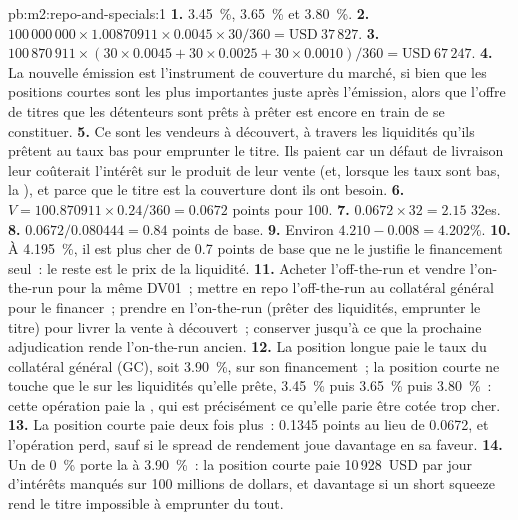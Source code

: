 \begin{solution}{pb:m2:repo-and-specials:1}
\textbf{1.} 3.45~\%, 3.65~\% et 3.80~\%.
\textbf{2.} $100\,000\,000 \times 1.00870911 \times 0.0045 \times 30/360 =
\text{USD}~37\,827$.
\textbf{3.} $100\,870\,911 \times (30 \times 0.0045 + 30 \times 0.0025 + 30 \times
0.0010)/360 = \text{USD}~67\,247$.
\textbf{4.} La nouvelle émission est l'instrument de couverture du marché, si bien que les positions courtes sont
les plus importantes juste après l'émission, alors que l'offre de titres que les détenteurs sont prêts à prêter
est encore en train de se constituer.
\textbf{5.} Ce sont les vendeurs à découvert, à travers les liquidités qu'ils prêtent au taux bas pour emprunter le
titre. Ils paient car un défaut de livraison leur coûterait l'intérêt sur le produit de leur vente
(et, lorsque les taux sont bas, la ), et parce que le titre est
la couverture dont ils ont besoin.
\textbf{6.} $V = 100.870911 \times 0.24/360 = 0.0672$ points pour 100.
\textbf{7.} $0.0672 \times 32 = 2.15$ 32es.
\textbf{8.} $0.0672/0.080444 = 0.84$ points de base.
\textbf{9.} Environ $4.210 - 0.008 = 4.202\%$.
\textbf{10.} À 4.195~\%, il est plus cher de 0.7 points de base que ne le justifie le
financement seul~: le reste est le prix de la liquidité.
\textbf{11.} Acheter l'off-the-run et vendre l'on-the-run pour la même DV01~; mettre en repo
l'off-the-run au collatéral général pour le financer~; prendre en 
l'on-the-run (prêter des liquidités, emprunter le titre) pour livrer la vente à découvert~; conserver jusqu'à ce que la
prochaine adjudication rende l'on-the-run ancien.
\textbf{12.} La position longue paie le taux du collatéral général (GC), soit 3.90~\%, sur son financement~; la position courte ne touche que
le  sur les liquidités qu'elle prête, 3.45~\% puis 3.65~\% puis 3.80~\%~: cette
opération paie la , qui est précisément ce qu'elle parie être cotée trop cher.
\textbf{13.} La position courte paie deux fois plus~: 0.1345 points au lieu de 0.0672, et
l'opération perd, sauf si le spread de rendement joue davantage en sa faveur.
\textbf{14.} Un  de 0~\% porte la  à 3.90~\%~: la position courte paie
10\,928~USD par jour d'intérêts manqués sur 100 millions de dollars, et davantage si un short squeeze
rend le titre impossible à emprunter du tout.

\end{solution}
